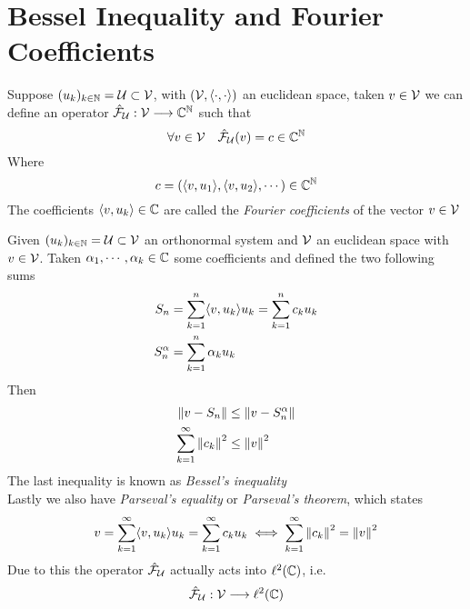 \documentclass[../complete.tex]{subfiles}
\begin{document}
\section{Bessel Inequality and Fourier Coefficients}
\begin{dfn}
	Suppose $(u_k)_{k\in\mathbb{N}}=\operatorname{\mathcal{U}}\subset\mathcal{V}$, with $(\mathcal{V},\operatorname{\langle\cdot,\cdot\rangle})$ an euclidean space, taken $v\in\mathcal{V}$ we can define an operator $\hat{\mathcal{F}}_{\operatorname{\mathcal{U}}}:\mathcal{V}\overset{}{\longrightarrow}\mathbb{C}^{\mathbb{N}}$ such that
	\begin{equation*}
		\forall v\in\mathcal{V}\quad\hat{\mathcal{F}}_{\operatorname{\mathcal{U}}}(v)=c\in\mathbb{C}^{\mathbb{N}}
	\end{equation*}
	Where
	\begin{equation*}
		c=(\langle v, u_1 \rangle,\langle v, u_2 \rangle,\cdots)\in\mathbb{C}^{\mathbb{N}}
	\end{equation*}
	The coefficients $\langle v, u_k \rangle\in\mathbb{C}$ are called the \textit{Fourier coefficients} of the vector $v\in\mathcal{V}$
\end{dfn}
\begin{thm}
	Given $(u_k)_{k\in\mathbb{N}}=\operatorname{\mathcal{U}}\subset\mathcal{V}$ an orthonormal system and $\mathcal{V}$ an euclidean space with $v\in\mathcal{V}$. Taken $\alpha_1,\cdots,\alpha_k\in\mathbb{C}$ some coefficients and defined the two following sums
	\begin{equation*}
		\begin{aligned}
			S_n&=\sum_{k=1}^{n}\langle v, u_k \rangle u_k=\sum_{k=1}^{n}c_ku_k\\
			S_n^\alpha&=\sum_{k=1}^{n}\alpha_ku_k
		\end{aligned}
	\end{equation*}
	Then
	\begin{equation*}
		\begin{aligned}
			\norm{v-S_n}&\le\norm{v-S_n^\alpha}\\
			\sum_{k=1}^{\infty}\norm{c_k}^2&\le\norm{v}^2\\
		\end{aligned}
	\end{equation*}
	The last inequality is known as \textit{Bessel's inequality}\\
	Lastly we also have \textit{Parseval's equality} or \textit{Parseval's theorem}, which states
	\begin{equation*}
		v=\sum_{k=1}^{\infty}\langle v, u_k \rangle u_k=\sum_{k=1}^{\infty}c_ku_k\iff\sum_{k=1}^{\infty}\norm{c_k}^2=\norm{v}^2
	\end{equation*}
	Due to this the operator $\hat{\mathcal{F}}_{\operatorname{\mathcal{U}}}$ actually acts into $\ell^2(\mathbb{C})$, i.e.
	\begin{equation*}
		\hat{\mathcal{F}}_{\operatorname{\mathcal{U}}}:\mathcal{V}\overset{}{\longrightarrow}\ell^2(\mathbb{C})
	\end{equation*}
\end{thm}
\end{document}
